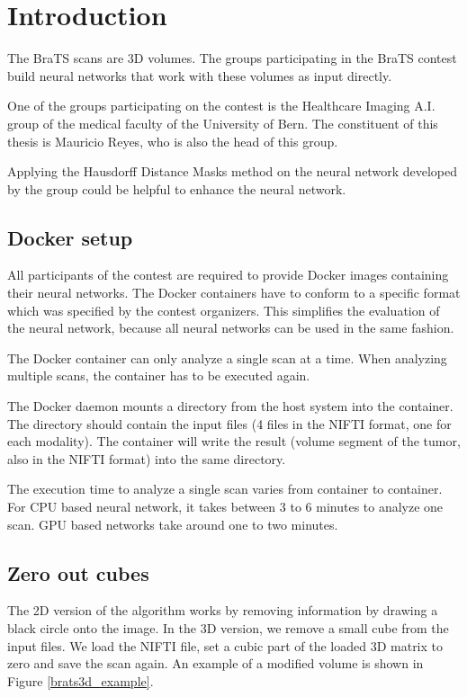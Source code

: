 \section{Introduction}
The BraTS scans are 3D volumes. The groups participating in the BraTS contest build neural networks that work with these volumes as input directly.

One of the groups participating on the contest is the Healthcare Imaging A.I. group of the medical faculty of the University of Bern. The constituent of this thesis
is Mauricio Reyes, who is also the head of this group.

Applying the Hausdorff Distance Masks method on the neural network developed by the group could be helpful to enhance the neural network.

\subsection{Docker setup}

All participants of the contest are required to provide Docker images containing their neural networks. The Docker containers have to conform to a specific format which
was specified by the contest organizers. This simplifies the evaluation of the neural network, because all neural networks can be used in the same fashion.

The Docker container can only analyze a single scan at a time. When analyzing multiple scans, the container has to be executed again.

The Docker daemon mounts a directory from the host system into the container. The directory should contain the input files (4 files in the NIFTI format, one for each modality). The container will write the result (volume segment of the tumor, also in the NIFTI format) into the same directory.

The execution time to analyze a single scan varies from container to container. For CPU based neural network, it takes between 3 to 6 minutes to analyze one scan. GPU based networks take around one to two minutes.

\subsection{Zero out cubes}
The 2D version of the algorithm works by removing information by drawing a black circle onto the image. In the 3D version, we remove a small cube from the input files.
We load the NIFTI file, set a cubic part of the loaded 3D matrix to zero and save the scan again. An example of a modified volume is shown in Figure \ref{brats3d_example}.

